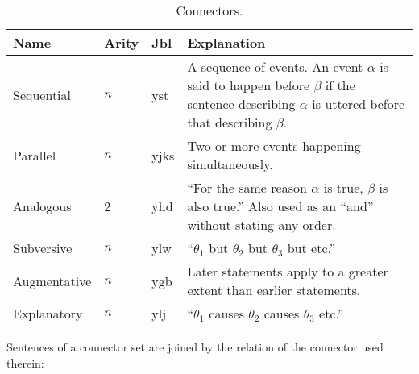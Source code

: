 \documentclass{book}
\newcommand{\lname}{Jbl}
\begin{document}
\begin{table}[ht]
  \caption{Connectors.}
  \centering
  \begin{tabu} to 
    Name & Arity & \textnormal{\lname} & Explanation \\
    \hline
    Sequential & $n$ & yst & A sequence of events. An event $\alpha$ is said to happen before $\beta$ if the sentence describing $\alpha$ is uttered before that describing $\beta$. \\
    Parallel & $n$ & yjks & Two or more events happening simultaneously. \\
    Analogous & 2 & yhd & ``For the same reason $\alpha$ is true, $\beta$ is also true.'' Also used as an ``and'' without stating any order. \\
    Subversive & $n$ & ylw & ``$\theta_1$ but $\theta_2$ but $\theta_3$ but etc.'' \\
    Augmentative & $n$ & ygb & Later statements apply to a greater extent than earlier statements. \\
    Explanatory & $n$ & ylj & ``$\theta_1$ causes $\theta_2$ causes $\theta_3$ etc.'' \\
  \end{tabu}
\end{table}

Sentences of a connector set are joined by the relation of the connector used therein: \\
~\\
 \\
 \\
    \\
   \\
~\\
 \\
 \\
     \\
     \\
~\\
 \\
 \\
    \\
    \\
\end{document}
